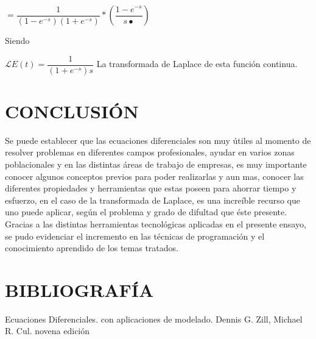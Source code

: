 \documentclass[12pt,a4paper]{article}
\begin{document}
\hspace{1.1cm} $= \dfrac{1}{(1-e^{-s})(1+e^{-s})} * (\dfrac{1-e^{-s}}{s•}) $

\vspace{0.5cm}
Siendo

\vspace{0.4cm}
$\mathcal{L}{E(t)} = \dfrac{1}{(1+e^{-s})s}$ La transformada de Laplace de esta función continua.

\vspace{0.6cm}
\section{CONCLUSIÓN}

Se puede establecer que las ecuaciones diferenciales son muy útiles al momento de resolver problemas en diferentes campos profesionales, ayudar en varios zonas poblacionales y en las distintas áreas de trabajo de empresas, es muy importante conocer algunos conceptos previos para poder realizarlas y aun mas, conocer las diferentes propiedades y herramientas que estas poseen para ahorrar tiempo y esfuerzo, en el caso de la transformada de Laplace, es una increíble recurso que uno puede aplicar, según el problema y grado de difultad que éste presente. 
Gracias a las distintas herramientas tecnológicas aplicadas en el presente ensayo, se pudo evidenciar el incremento en las técnicas de programación y el conocimiento aprendido de los temas tratados.

\vspace{0.5cm}
\section{BIBLIOGRAFÍA}

Ecuaciones Diferenciales. con aplicaciones de modelado. Dennis G. Zill, Michael R. Cul. novena edición
\end{document}
